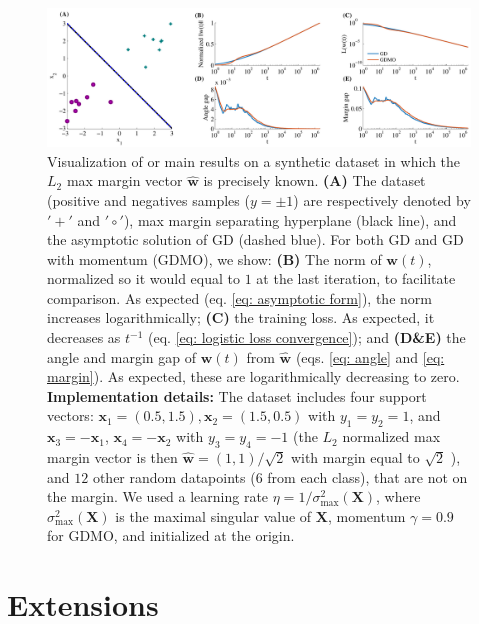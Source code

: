 \documentclass[twoside,11pt,english]{article}
\begin{document}
\begin{figure}[t!]
\begin{centering}
\includegraphics[width=1\columnwidth]{Plots/ToyDataset} 
\par\end{centering}
\caption{Visualization of or main results on a synthetic dataset in which the
$L_{2}$ max margin vector $\hat{\mathbf{w}}$ is precisely known.
\textbf{(A)} The dataset (positive and negatives samples ($y=\pm1$)
are respectively denoted by $'+'$ and $'\circ'$), max margin separating
hyperplane (black line), and the asymptotic solution of GD (dashed
blue). For both GD and GD with momentum (GDMO), we show: \textbf{(B)
}The norm of $\mathbf{w}\left(t\right)$, normalized so it would equal
to $1$ at the last iteration, to facilitate comparison. As expected
(eq. \ref{eq: asymptotic form}), the norm increases logarithmically;
\textbf{(C) }the training loss. As expected, it decreases as $t^{-1}$
(eq. \ref{eq: logistic loss convergence}); and \textbf{(D\&E) }the
angle and margin gap of $\mathbf{w}\left(t\right)$ from $\hat{\mathbf{w}}$
(eqs. \ref{eq: angle} and \ref{eq: margin}). As expected, these
are logarithmically decreasing to zero. \textbf{Implementation details:}
The dataset includes four support vectors: $\mathbf{x}_{1}=\left(0.5,1.5\right),\mathbf{x}_{2}=\left(1.5,0.5\right)$
with $y_{1}=y_{2}=1$, and $\mathbf{x}_{3}=-\mathbf{x}_{1}$, $\mathbf{x}_{4}=-\mathbf{x}_{2}$
with $y_{3}=y_{4}=-1$ (the $L_{2}$ normalized max margin vector
is then $\hat{\mathbf{w}}=\left(1,1\right)/\sqrt{2}$ with margin
equal to $\sqrt{2}$ ), and $12$ other random datapoints ($6$ from
each class), that are not on the margin. We used a learning rate $\eta=1/\sigma^2_{\max}\left(\mathbf{X}\right)$,
where $\sigma^2_{\max}\left(\mathbf{X}\right)$ is the maximal singular
value of $\mathbf{X}$, momentum $\gamma=0.9$ for GDMO, and initialized
at the origin. \label{fig:Synthetic-dataset}}
\end{figure}

\section{Extensions}
\end{document}
